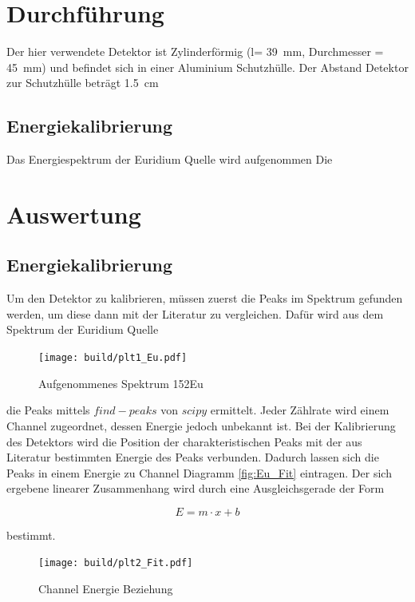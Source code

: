 \section{Durchführung \cite[vgl.][]{man:v18}}

Der hier verwendete Detektor ist Zylinderförmig (l= \qty{39}{\mm}, Durchmesser = \qty{45}{\mm}) und befindet sich in einer Aluminium
Schutzhülle. Der Abstand Detektor zur Schutzhülle beträgt \qty{1.5}{\cm}  


\subsection{Energiekalibrierung}
Das Energiespektrum der Euridium Quelle wird aufgenommen
Die 


\newpage
\section{Auswertung}
\subsection{Energiekalibrierung}
Um den Detektor zu kalibrieren, müssen zuerst die Peaks im Spektrum gefunden werden, um diese dann mit der Literatur zu vergleichen. 
Dafür wird aus dem Spektrum der Euridium Quelle 

\begin{figure}[H]
    \centering
    \texttt{[image: build/plt1\_Eu.pdf]}
	\caption{Aufgenommenes Spektrum 152Eu}\label{fig:Eu_spektrum}
\end{figure}

die Peaks mittels $find-peaks$ von $scipy$ \cite{scipy} ermittelt.
Jeder Zählrate wird einem Channel zugeordnet, dessen Energie jedoch unbekannt ist. 
Bei der Kalibrierung des Detektors wird die Position der charakteristischen Peaks mit der aus Literatur \cite{web:Eu}
bestimmten Energie des Peaks verbunden. 
Dadurch lassen sich die Peaks in einem Energie zu Channel Diagramm \eqref{fig:Eu_Fit} eintragen. 
Der sich ergebene linearer Zusammenhang wird durch eine Ausgleichsgerade der Form 

\begin{equation}
	E=m \cdot x +b
\end{equation}

bestimmt.

\begin{figure}[H]
    \centering
    \texttt{[image: build/plt2\_Fit.pdf]}
	\caption{Channel Energie Beziehung}\label{fig:Eu_Fit}
\end{figure}

